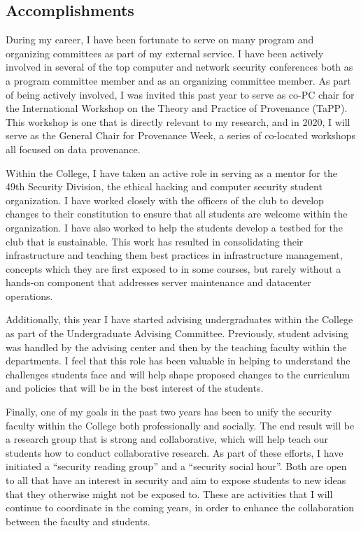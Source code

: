 \hypertarget{service-accomplishments}{%
\subsection{Accomplishments}\label{service-accomplishments}}

During my career, I have been fortunate to serve on many program and organizing committees as part of my external service. I have been actively involved in several of the top computer and network security conferences both as a program committee member and as an organizing committee member. As part of being actively involved, I was invited this past year to serve as co-PC chair for the International Workshop on the Theory and Practice of Provenance (TaPP). This workshop is one that is directly relevant to my research, and in 2020, I will serve as the General Chair for Provenance Week, a series of co-located workshops all focused on data provenance.

Within the College, I have taken an active role in serving as a mentor for the 49th Security Division, the ethical hacking and computer security student organization. I have worked closely with the officers of the club to develop changes to their constitution to ensure that all students are welcome within the organization. I have also worked to help the students develop a testbed for the club that is sustainable. This work has resulted in consolidating their infrastructure and teaching them best practices in infrastructure management, concepts which they are first exposed to in some courses, but rarely without a hands-on component that addresses server maintenance and datacenter operations.

Additionally, this year I have started advising undergraduates within the College as part of the Undergraduate Advising Committee. Previously, student advising was handled by the advising center and then by the teaching faculty within the departments. I feel that this role has been valuable in helping to understand the challenges students face and will help shape proposed changes to the curriculum and policies that will be in the best interest of the students.

Finally, one of my goals in the past two years has been to unify the security faculty within the College both professionally and socially. The end result will be a research group that is strong and collaborative, which will help teach our students how to conduct collaborative research. As part of these efforts, I have initiated a ``security reading group'' and a ``security social hour''. Both are open to all that have an interest in security and aim to expose students to new ideas that they otherwise might not be exposed to. These are activities that I will continue to coordinate in the coming years, in order to enhance the collaboration between the faculty and students.

